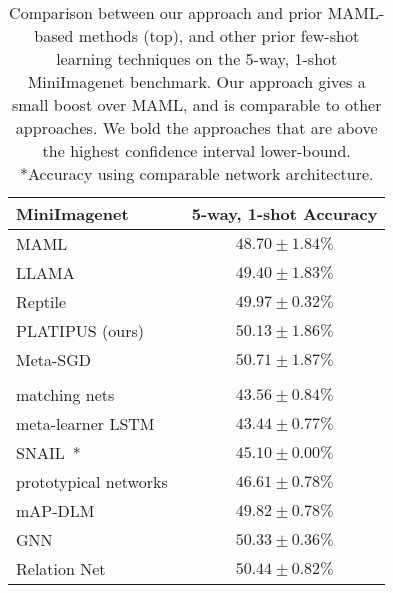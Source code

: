 \documentclass{article}
\begin{document}
\begin{table*}
\centering
\begin{tabular}{|l|c|}
\hline
MiniImagenet  &  5-way, 1-shot Accuracy \\
\hline
MAML~\cite{finn2017meta}  & $48.70 \pm 1.84\%$  \\
\hline
LLAMA~\cite{grant2018recasting}  & $49.40 \pm 1.83\%$  \\
\hline
Reptile~\cite{nichol2018reptile} & $\mathbf{49.97 \pm 0.32\%}$  \\
\hline
PLATIPUS (ours) & $\mathbf{50.13 \pm 1.86\%}$  \\
\hline
Meta-SGD~\cite{li2017meta} & $\mathbf{50.71 \pm 1.87\%}$  \\
\hline
& \vspace{-0.3cm} \\
\hline
matching nets~\cite{vinyals2016matching} & $43.56 \pm 0.84\%$ \\
\hline
meta-learner LSTM~\cite{ravi2017optimization} & $43.44 \pm 0.77\%$  \\
\hline
SNAIL~\cite{mishra2018a}* & $45.10 \pm 0.00 \%$  \\
\hline
prototypical networks~\cite{snell2017prototypical} & $46.61 \pm 0.78\%$  \\
\hline
mAP-DLM~\cite{snell2017prototypical} & $49.82 \pm 0.78\%$  \\
\hline
GNN~\cite{garcia2017few} & $\mathbf{50.33 \pm 0.36\%}$  \\
\hline
Relation Net~\cite{sung2017learning} & $\mathbf{50.44 \pm 0.82\%}$  \\
\hline
\end{tabular}
\vspace{-0.2cm}
\caption{Comparison between our approach and prior MAML-based methods (top), and other prior few-shot learning techniques on the 5-way, 1-shot MiniImagenet benchmark. Our approach gives a small boost over MAML, and is comparable to other approaches. We bold the approaches that are above the highest confidence interval lower-bound. *Accuracy using comparable network architecture.
\label{tbl:miniimagenet}
}
\end{table*} 
\end{document}
